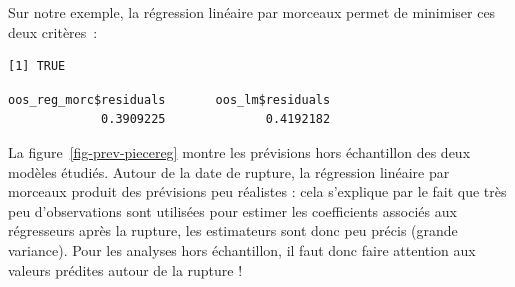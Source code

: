 \documentclass[
  a4paper,
  DIV=11,
  numbers=noendperiod,
  french]{scrartcl}
\newenvironment{Shaded}{\begin{snugshade}}{\end{snugshade}}
\newcommand{\AttributeTok}[1]{\textcolor[rgb]{0.40,0.45,0.13}{#1}}
\newcommand{\CommentTok}[1]{\textcolor[rgb]{0.37,0.37,0.37}{#1}}
\newcommand{\DecValTok}[1]{\textcolor[rgb]{0.68,0.00,0.00}{#1}}
\newcommand{\FunctionTok}[1]{\textcolor[rgb]{0.28,0.35,0.67}{#1}}
\newcommand{\NormalTok}[1]{\textcolor[rgb]{0.00,0.23,0.31}{#1}}
\newcommand{\OtherTok}[1]{\textcolor[rgb]{0.00,0.23,0.31}{#1}}
\newcommand{\SpecialCharTok}[1]{\textcolor[rgb]{0.37,0.37,0.37}{#1}}
\newcommand\1{{\mathds 1}}
\theoremstyle{remark}
\begin{document}
Sur notre exemple, la régression linéaire par morceaux permet de
minimiser ces deux critères~:

\begin{Shaded}
\end{Shaded}

\begin{verbatim}
[1] TRUE
\end{verbatim}

\begin{Shaded}
\end{Shaded}

\begin{verbatim}
oos_reg_morc$residuals       oos_lm$residuals 
             0.3909225              0.4192182 
\end{verbatim}

La figure~\ref{fig-prev-piecereg} montre les prévisions hors échantillon
des deux modèles étudiés. Autour de la date de rupture, la régression
linéaire par morceaux produit des prévisions peu réalistes : cela
s'explique par le fait que très peu d'observations sont utilisées pour
estimer les coefficients associés aux régresseurs après la rupture, les
estimateurs sont donc peu précis (grande variance). Pour les analyses
hors échantillon, il faut donc faire attention aux valeurs prédites
autour de la rupture !
\end{document}
